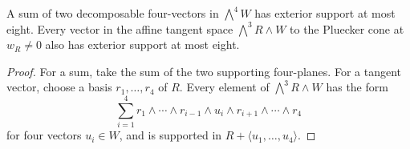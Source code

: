 \begin{lemma}
\label{lem:secant-tangent-support}
A sum of two decomposable four-vectors in \(\bigwedge^4W\)
has exterior support at most eight.  Every vector in the affine
tangent space \(\bigwedge^3R\wedge W\) to the Pluecker cone
at \(w_R\ne0\) also has exterior support at most eight.
\end{lemma}
\begin{proof}
For a sum, take the sum of the two supporting four-planes.  For a
tangent vector, choose a basis \(r_1,\ldots,r_4\) of \(R\).
Every element of \(\bigwedge^3R\wedge W\) has the form
\[
 \sum_{i=1}^4 r_1\wedge\cdots\wedge r_{i-1}
             \wedge u_i\wedge r_{i+1}\wedge\cdots\wedge r_4
\]
for four vectors \(u_i\in W\), and is supported in
\(R+\langle u_1,\ldots,u_4\rangle\).
\end{proof}

